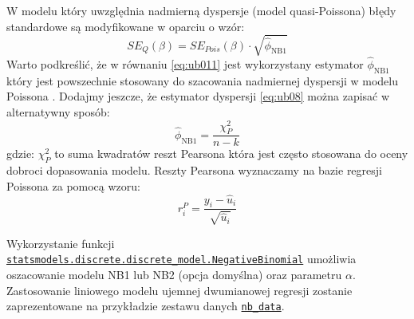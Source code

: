 \documentclass[polish,]{book}
\begin{document}
W modelu który uwzględnia nadmierną dyspersje (model quasi-Poissona) błędy standardowe są modyfikowane w oparciu o wzór:
\begin{equation}
SE_{Q}(\beta)=SE_{Pois}(\beta)\cdot \sqrt{\hat{\phi}_{\mathrm{NB1}}}
\label{eq:ub011}
\end{equation}
Warto podkreślić, że w równaniu \eqref{eq:ub011} jest wykorzystany estymator \(\hat{\phi}_{\mathrm{NB1}}\) który jest powszechnie stosowany do szacowania nadmiernej dyspersji w modelu Poissona \citep{glm1989}.
Dodajmy jeszcze, że estymator dyspersji \eqref{eq:ub08} można zapisać w alternatywny sposób:
\begin{equation}
\hat{\phi}_{\mathrm{NB1}}=\frac{\chi^2_P}{n-k}
\label{eq:ub012}
\end{equation}
gdzie: \(\chi^2_{P}\) to suma kwadratów reszt Pearsona która jest często stosowana do oceny dobroci dopasowania modelu. Reszty Pearsona wyznaczamy na bazie regresji Poissona za pomocą wzoru:
\begin{equation}
r_{i}^P=\frac{y_i-\hat{u}_i}{\sqrt{\hat{u}_i}}
\label{eq:ub013}
\end{equation}

Wykorzystanie funkcji \href{https://www.statsmodels.org/dev/generated/statsmodels.discrete.discrete_model.NegativeBinomial.html\#statsmodels.discrete.discrete_model.NegativeBinomial}{\texttt{statsmodels.discrete.discrete\_model.NegativeBinomial}} umożliwia oszacowanie modelu NB1 lub NB2 (opcja domyślna) oraz parametru \(\alpha\). Zastosowanie liniowego modelu ujemnej dwumianowej regresji zostanie zaprezentowane na przykładzie zestawu danych \href{https://stats.idre.ucla.edu/r/dae/negative-binomial-regression/}{\texttt{nb\_data}}.
\end{document}
